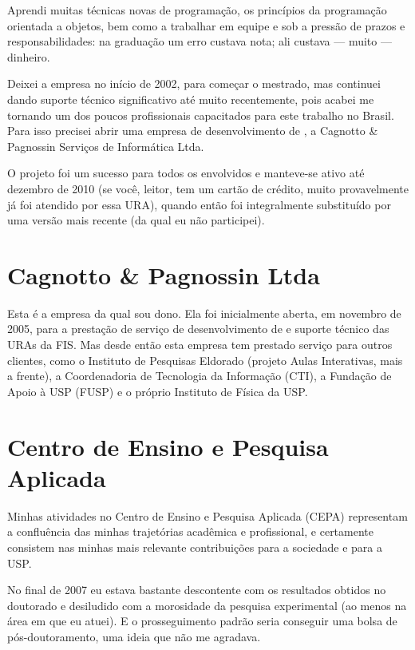 Aprendi muitas técnicas novas de programação, os princípios da programação orientada a objetos, bem como a trabalhar em equipe e sob a pressão de prazos e responsabilidades: na graduação um erro custava nota; ali custava --- muito --- dinheiro.

Deixei a empresa no início de 2002, para começar o mestrado, mas continuei dando suporte técnico significativo até muito recentemente, pois acabei me tornando um dos poucos profissionais capacitados para este trabalho no Brasil. Para isso precisei abrir uma empresa de desenvolvimento de , a Cagnotto \& Pagnossin Serviços de Informática Ltda.

O projeto foi um sucesso para todos os envolvidos e manteve-se ativo até dezembro de 2010 (se você, leitor, tem um cartão de crédito, muito provavelmente já foi atendido por essa URA), quando então foi integralmente substituído por uma versão mais recente (da qual eu não participei).

\section{Cagnotto \& Pagnossin Ltda}

Esta é a empresa da qual sou dono. Ela foi inicialmente aberta, em novembro de 2005, para a prestação de serviço de desenvolvimento de  e suporte técnico das URAs da FIS. Mas desde então esta empresa tem prestado serviço para outros clientes, como o Instituto de Pesquisas Eldorado (projeto Aulas Interativas, mais a frente), a Coordenadoria de Tecnologia da Informação (CTI), a Fundação de Apoio à USP (FUSP) e o próprio Instituto de Física da USP.

\section{Centro de Ensino e Pesquisa Aplicada}
\label{sec:cepa}

Minhas atividades no Centro de Ensino e Pesquisa Aplicada (CEPA) representam a confluência das minhas trajetórias acadêmica e profissional, e certamente consistem nas minhas mais relevante contribuições para a sociedade e para a USP.

No final de 2007 eu estava bastante descontente com os resultados obtidos no doutorado e desiludido com a morosidade da pesquisa experimental (ao menos na área em que eu atuei). E o prosseguimento padrão seria conseguir uma bolsa de pós-doutoramento, uma ideia que não me agradava.

